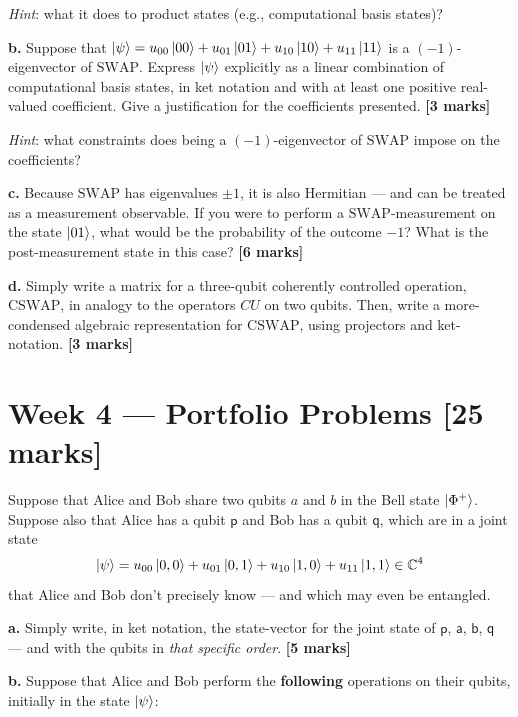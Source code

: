 \documentclass[12pt,a4paper]{article}
\begin{document}
\smallskip
\textit{Hint}: what it does to product states (e.g., computational basis states)?

\medskip
\textbf{b.}
Suppose that $\ket{\psi} = u_{00}\ket{00}+u_{01}\ket{01}+u_{10}\ket{10}+u_{11}\ket{11}$ is a
$(-1)$-eigenvector of $\mathrm{SWAP}$. Express $\ket{\psi}$ explicitly as a linear combination of
computational basis states, in ket notation and with at least one positive real-valued coefficient.
Give a justification for the coefficients presented.
\hfill\textbf{[3 marks]}

\smallskip
\textit{Hint}: what constraints does being a $(-1)$-eigenvector of $\mathrm{SWAP}$ impose on the
coefficients?

\medskip
\textbf{c.}
Because $\mathrm{SWAP}$ has eigenvalues $\pm 1$, it is also Hermitian --- and can be treated as a
measurement observable. If you were to perform a $\mathrm{SWAP}$-measurement on the state
$\ket{01}$, what would be the probability of the outcome $-1$? What is the post-measurement state
in this case?
\hfill\textbf{[6 marks]}

\medskip
\textbf{d.}
Simply write a matrix for a three-qubit coherently controlled operation, $\mathrm{CSWAP}$, in
analogy to the operators $CU$ on two qubits. Then, write a more-condensed algebraic representation
for $\mathrm{CSWAP}$, using projectors and ket-notation.
\hfill\textbf{[3 marks]}

\section*{Week 4 --- Portfolio Problems \hfill [25 marks]}

Suppose that Alice and Bob share two qubits $a$ and $b$ in the Bell state $\ket{\Phi^+}$. Suppose
also that Alice has a qubit $\mathsf{p}$ and Bob has a qubit $\mathsf{q}$, which are in a joint
state
\[
  \ket{\psi} = u_{00}\ket{0,0}+u_{01}\ket{0,1}+u_{10}\ket{1,0}+u_{11}\ket{1,1}\in\mathbb{C}^4
\]
that Alice and Bob don't precisely know --- and which may even be entangled.

\medskip
\textbf{a.}
Simply write, in ket notation, the state-vector for the joint state of $\mathsf{p}$, $\mathsf{a}$,
$\mathsf{b}$, $\mathsf{q}$ --- and with the qubits in \textit{that specific order}.
\hfill\textbf{[5 marks]}

\medskip
\textbf{b.}
Suppose that Alice and Bob perform the \textbf{following} operations on their qubits, initially in
the state $\ket{\psi}$:
\end{document}

